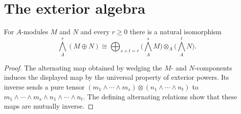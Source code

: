 \section{The exterior algebra}

\begin{theorem}
\label{mcrt-thm-c-2}
\uses{}
For $A$-modules $M$ and $N$ and every $r\geq0$ there is a natural isomorphism
\[
\bigwedge_A^r(M\oplus N)
\cong\bigoplus_{s+t=r}\bigl(\bigwedge_A^sM\bigr)\otimes_A
\bigl(\bigwedge_A^tN\bigr).
\]
\end{theorem}
\begin{proof}
The alternating map obtained by wedging the $M$- and $N$-components induces
the displayed map by the universal property of exterior powers.  Its inverse
sends a pure tensor $(m_1\wedge\cdots\wedge m_s)\otimes
(n_1\wedge\cdots\wedge n_t)$ to
$m_1\wedge\cdots\wedge m_s\wedge n_1\wedge\cdots\wedge n_t$.
The defining alternating relations show that these maps are mutually inverse.
\end{proof}
